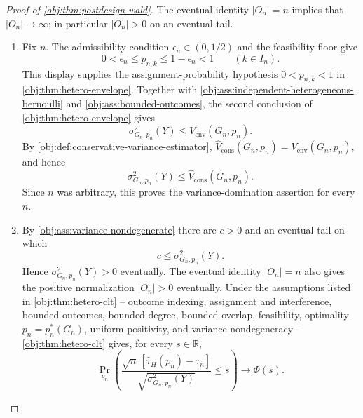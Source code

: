 \begin{proof}[Proof of \cref{obj:thm:postdesign-wald}]
The eventual identity \(|O_n|=n\) implies that \(|O_n|\to\infty\); in particular \(|O_n|>0\) on an eventual tail.

\begin{enumerate}
\item Fix \(n\).  The admissibility condition \(\epsilon_n\in(0,1/2)\) and the feasibility floor give
\[
0<\epsilon_n\le p_{n,k}\le 1-\epsilon_n<1
\qquad(k\in I_n).
\]
This display supplies the assignment-probability hypothesis \(0<p_{n,k}<1\) in \cref{obj:thm:hetero-envelope}.  Together with \cref{obj:ass:independent-heterogeneous-bernoulli} and \cref{obj:ass:bounded-outcomes}, the second conclusion of \cref{obj:thm:hetero-envelope} gives
\[
\sigma^2_{G_n,p_n}(Y)\le V_{\mathrm{env}}(G_n,p_n).
\]
By \cref{obj:def:conservative-variance-estimator},
\(\widehat V_{\mathrm{cons}}(G_n,p_n)=V_{\mathrm{env}}(G_n,p_n)\), and hence
\[
\sigma^2_{G_n,p_n}(Y)\le \widehat V_{\mathrm{cons}}(G_n,p_n).
\]
Since \(n\) was arbitrary, this proves the variance-domination assertion for every \(n\).

\item By \cref{obj:ass:variance-nondegenerate} there are \(c>0\) and an eventual tail on which
\[
c\le \sigma^2_{G_n,p_n}(Y).
\]
Hence \(\sigma^2_{G_n,p_n}(Y)>0\) eventually.  The eventual identity
\(|O_n|=n\) also gives the positive normalization \(|O_n|>0\) eventually.
Under the assumptions listed in \cref{obj:thm:hetero-clt} -- outcome indexing,
assignment and interference, bounded outcomes, bounded degree, bounded overlap,
feasibility, optimality \(p_n=p_n^*(G_n)\), uniform positivity, and variance
nondegeneracy -- \cref{obj:thm:hetero-clt} gives, for every \(s\in\mathbb R\),
\[
\Pr_{p_n}\!\left(
\frac{\sqrt n\,[\widehat\tau_H(p_n)-\tau_n]}
{\sqrt{\sigma^2_{G_n,p_n}(Y)}}\le s
\right)
\longrightarrow \Phi(s).
\]


\end{enumerate}
\end{proof}
